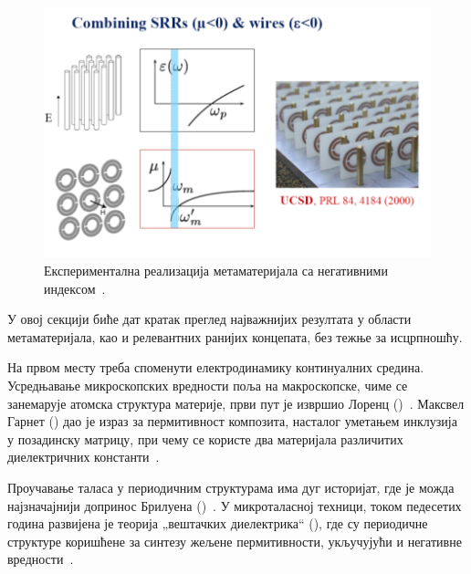\documentclass[main.tex]{subfiles}
\begin{document}
\begin{figure}[h]
    \centering
    \includegraphics[width=0.8\linewidth]{sl_uvod/zice_srr_branka.png}
    \caption{Експериментална реализација метаматеријала са негативними индексом~\cite{smith:00}.}
    \label{uvod:mm_smit}
\end{figure}

У овој секцији биће дат кратак преглед најважнијих резултата у области метаматеријала, као и релевантних ранијих концепата, без тежње за исцрпношћу.

На првом месту треба споменути електродинамику континуалних средина. Усредњавање микроскопских вредности поља на макроскопске, чиме се занемарује атомска структура материје, први пут је извршио Лоренц ()~\cite{landau1982}. Максвел Гарнет () дао је израз за пермитивност композита, насталог уметањем инклузија у позадинску матрицу, при чему се користе два материјала различитих диелектричних константи~\cite{garnett1906vii}. 

Проучавање таласа у периодичним структурама има дуг историјат, где је можда најзначајнији допринос Брилуена ()~\cite{brillouin2003wave}. У микроталасној техници, током педесетих година развијена је теорија „вештачких диелектрика`` (), где су периодичне структуре коришћене за синтезу жељене пермитивности, укључујући и негативне вредности~\cite{rotman1962plasma}. 
\end{document}
